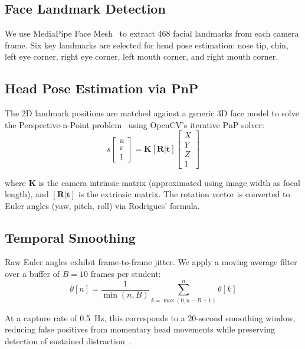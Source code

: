 \documentclass[conference]{IEEEtran}
\begin{document}
\subsection{Face Landmark Detection}

We use MediaPipe Face Mesh~\cite{lugaresi2019mediapipe} to extract 468 facial landmarks from each camera frame. Six key landmarks are selected for head pose estimation: nose tip, chin, left eye corner, right eye corner, left mouth corner, and right mouth corner.

\subsection{Head Pose Estimation via PnP}

The 2D landmark positions are matched against a generic 3D face model to solve the Perspective-n-Point problem~\cite{lepetit2009epnp} using OpenCV's iterative PnP solver:
\begin{equation}
s \begin{bmatrix} u \\ v \\ 1 \end{bmatrix} = \mathbf{K} [\mathbf{R} | \mathbf{t}] \begin{bmatrix} X \\ Y \\ Z \\ 1 \end{bmatrix}
\label{eq:pnp}
\end{equation}

where $\mathbf{K}$ is the camera intrinsic matrix (approximated using image width as focal length), and $[\mathbf{R} | \mathbf{t}]$ is the extrinsic matrix. The rotation vector is converted to Euler angles (yaw, pitch, roll) via Rodrigues' formula.

\subsection{Temporal Smoothing}

Raw Euler angles exhibit frame-to-frame jitter. We apply a moving average filter over a buffer of $B = 10$ frames per student:
\begin{equation}
\bar{\theta}[n] = \frac{1}{\min(n, B)} \sum_{k=\max(0, n-B+1)}^{n} \theta[k]
\label{eq:ma}
\end{equation}

At a capture rate of 0.5~Hz, this corresponds to a 20-second smoothing window, reducing false positives from momentary head movements while preserving detection of sustained distraction~\cite{sariyanidi2015}.
\end{document}
